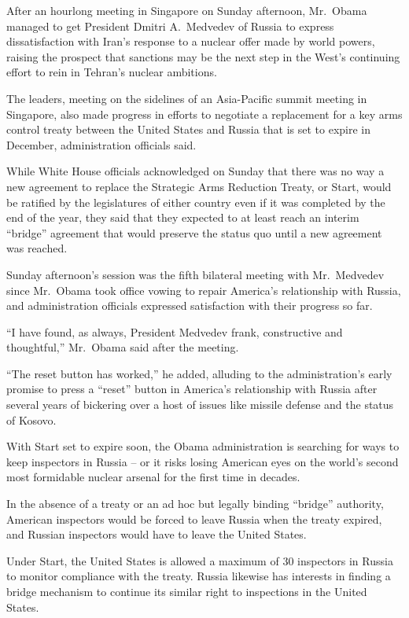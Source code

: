﻿\documentclass[12pt]{article}
\begin{document}
After an hourlong meeting in Singapore on Sunday afternoon, Mr.~Obama managed to get President
Dmitri A.~Medvedev of Russia to express dissatisfaction with Iran's response to a nuclear offer made
by world powers, raising the prospect that sanctions may be the next step in the West's continuing
effort to rein in Tehran's nuclear ambitions.

The leaders, meeting on the sidelines of an Asia-Pacific summit meeting in Singapore, also made
progress in efforts to negotiate a replacement for a key arms control treaty between the United
States and Russia that is set to expire in December, administration officials said.

While White House officials acknowledged on Sunday that there was no way a new agreement to replace
the Strategic Arms Reduction Treaty, or Start, would be ratified by the legislatures of either
country even if it was completed by the end of the year, they said that they expected to at least
reach an interim ``bridge'' agreement that would preserve the status quo until a new agreement was
reached.

Sunday afternoon's session was the fifth bilateral meeting with Mr.~Medvedev since Mr.~Obama took
office vowing to repair America's relationship with Russia, and administration officials expressed
satisfaction with their progress so far.

``I have found, as always, President Medvedev frank, constructive and thoughtful,'' Mr.~Obama said
after the meeting.

``The reset button has worked,'' he added, alluding\cite{allude} to the administration's early
promise to press a ``reset'' button in America's relationship with Russia after several years of
bickering over a host of issues like missile defense and the status of Kosovo.

With Start set to expire soon, the Obama administration is searching for ways to keep inspectors in
Russia -- or it risks losing American eyes on the world's second most formidable nuclear arsenal for
the first time in decades.

In the absence of a treaty or an ad hoc but legally binding ``bridge'' authority, American
inspectors would be forced to leave Russia when the treaty expired, and Russian inspectors would
have to leave the United States.

Under Start, the United States is allowed a maximum of 30 inspectors in Russia to monitor compliance
with the treaty. Russia likewise has interests in finding a bridge mechanism to continue its similar
right to inspections in the United States.
\end{document}
